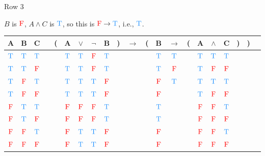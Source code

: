 \documentclass[
  ignorenonframetext,
]{beamer}
\renewcommand{\,}{\text{, }}
\def\True{\textcolor{dodgerblue}{\text{T}}}
\def\False{\textcolor{red}{\text{F}}}
\begin{document}
\begin{frame}{Row 3}
\protect\hypertarget{row-3}{}

\(B\) is \(\False\), \(A \wedge C\) is \(\True\), so this is
\(\False \rightarrow \True\), i.e., \(\True\).

\begin{center}
\bigskip
\begin{tabular}{@{ }c@{ }@{ }c@{ }@{ }c | c@{ }@{}c@{}@{ }c@{ }@{ }c@{ }@{ }c@{ }@{ }c@{ }@{}c@{}@{ }c@{ }@{}c@{}@{ }c@{ }@{ }c@{ }@{}c@{}@{ }c@{ }@{ }c@{ }@{ }c@{ }@{}c@{}@{}c@{}@{ }c}
A & B & C &  & ( & A & $\vee$ & $\neg$ & B & ) & $\rightarrow$ & ( & B & $\rightarrow$ & ( & A & $\wedge$ & C & ) & ) & \\
\hline 
 $\True$ & $\True$ & $\True$ &  &  & $\True$ & $\True$ & $\False$ & $\True$ &  &&  & $\True$ & $\True$ &  & $\True$ & $\True$ & $\True$ &  &  & \\
 $\True$ & $\True$ & $\False$ &  &  & $\True$ & $\True$ & $\False$ & $\True$ &  &&  & $\True$ & $\False$ &  & $\True$ & $\False$ & $\False$ &  &  & \\
 $\True$ & $\False$ & $\True$ &  &  & $\True$ & $\True$ & $\True$ & $\False$ &  &&  & $\False$ & $\True$ &  & $\True$ & $\True$ & $\True$ &  &  & \\
 $\True$ & $\False$ & $\False$ &  &  & $\True$ & $\True$ & $\True$ & $\False$ &  &&  & $\False$ &&  & $\True$ & $\False$ & $\False$ &  &  & \\
 $\False$ & $\True$ & $\True$ &  &  & $\False$ & $\False$ & $\False$ & $\True$ &  &&  & $\True$ &&  & $\False$ & $\False$ & $\True$ &  &  & \\
 $\False$ & $\True$ & $\False$ &  &  & $\False$ & $\False$ & $\False$ & $\True$ &  &&  & $\True$ &&  & $\False$ & $\False$ & $\False$ &  &  & \\
 $\False$ & $\False$ & $\True$ &  &  & $\False$ & $\True$ & $\True$ & $\False$ &  &&  & $\False$ &&  & $\False$ & $\False$ & $\True$ &  &  & \\
 $\False$ & $\False$ & $\False$ &  &  & $\False$ & $\True$ & $\True$ & $\False$ &  &&  & $\False$ &&  & $\False$ & $\False$ & $\False$ &  &  & \\
\end{tabular}
\bigskip
\end{center}

\end{frame}
\end{document}
